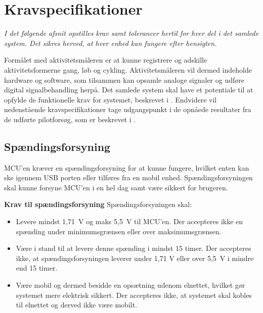 \section{Kravspecifikationer}
\textit{I det følgende afsnit opstilles krav samt tolerancer hertil for hver del i det samlede system. Det sikres herved, at hver enhed kan fungere efter hensigten.}

Formålet med aktivitetsmåleren er at kunne registrere og adskille aktivitetsformerne gang, løb og cykling. Aktivitetsmåleren vil dermed indeholde hardware og software, som tilsammen kan opsamle analoge signaler og udføre digital signalbehandling herpå. Det samlede system skal have et potentiale til at opfylde de funktionelle krav for systemet, beskrevet i . Endvidere vil nedenstående kravspecifikationer tage udgangspunkt i de opnåede resultater fra de udførte pilotforsøg, som er beskrevet i .
%

\subsection{Spændingsforsyning} \label{krav_spaendingsf}
MCU'en kræver en spændingsforsyning for at kunne fungere, hvilket enten kan ske igennem USB porten eller tilføres fra en mobil enhed. Spændingsforsyningen skal kunne forsyne MCU'en i en hel dag samt være sikkert for brugeren. %

\textbf{Krav til spændingsforsyning} \newline 
Spændingsforsyningen skal:
\begin{itemize}
	\item Levere mindst 1,71~V og maks 5,5~V til MCU'en. Der accepteres ikke en spænding under minimumsgrænsen eller over maksimumsgrænsen. %
	\item Være i stand til at levere denne spænding i mindst 15 timer. Der accepteres ikke, at spændingsforsyningen leverer under 1,71 V eller over 5,5~V i mindre end 15 timer.
	\item Være mobil og dermed besidde en opsætning udenom elnettet, hvilket gør systemet mere elektrisk sikkert. Der accepteres ikke, at systemet skal kobles til elnettet og derved ikke være mobilt.
\end{itemize}

